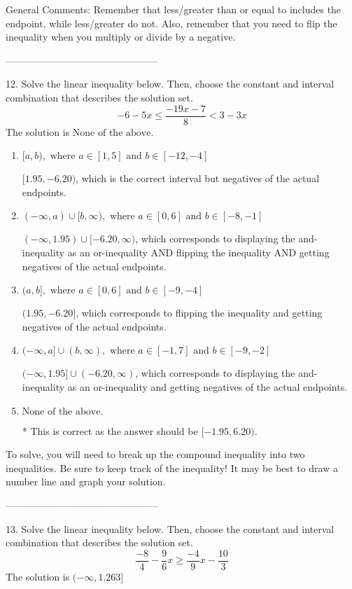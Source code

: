 \documentclass{article}[14pt]
\begin{document}
General Comments: Remember that less/greater than or equal to includes the endpoint, while less/greater do not. Also, remember that you need to flip the inequality when you multiply or divide by a negative.

-----------------------------------------------

12. Solve the linear inequality below. Then, choose the constant and interval combination that describes the solution set.
$$ -6 - 5 x \leq \frac{-19 x - 7}{8} < 3 - 3 x $$ 
The solution is $ \text{None of the above.} $ 

\begin{enumerate}[label=\Alph*.] 
\item $ [a, b), \text{ where } a \in [1, 5] \text{ and } b \in [-12, -4] $ 

 $[1.95, -6.20)$, which is the correct interval but negatives of the actual endpoints. 
\item $ (-\infty, a) \cup [b, \infty), \text{ where } a \in [0, 6] \text{ and } b \in [-8, -1] $ 

 $(-\infty, 1.95) \cup [-6.20, \infty)$, which corresponds to displaying the and-inequality as an or-inequality AND flipping the inequality AND getting negatives of the actual endpoints. 
\item $ (a, b], \text{ where } a \in [0, 6] \text{ and } b \in [-9, -4] $ 

 $(1.95, -6.20]$, which corresponds to flipping the inequality and getting negatives of the actual endpoints. 
\item $ (-\infty, a] \cup (b, \infty), \text{ where } a \in [-1, 7] \text{ and } b \in [-9, -2] $ 

 $(-\infty, 1.95] \cup (-6.20, \infty)$, which corresponds to displaying the and-inequality as an or-inequality and getting negatives of the actual endpoints. 
\item $ \text{None of the above.} $ 

 * This is correct as the answer should be $[-1.95, 6.20)$. 
\end{enumerate} 
 
To solve, you will need to break up the compound inequality into two inequalities. Be sure to keep track of the inequality! It may be best to draw a number line and graph your solution.

-----------------------------------------------

13. Solve the linear inequality below. Then, choose the constant and interval combination that describes the solution set.
$$ \frac{-8}{4} - \frac{9}{6} x \geq \frac{-4}{9} x - \frac{10}{3} $$ 
The solution is $ (-\infty, 1.263] $ 
\end{document}
